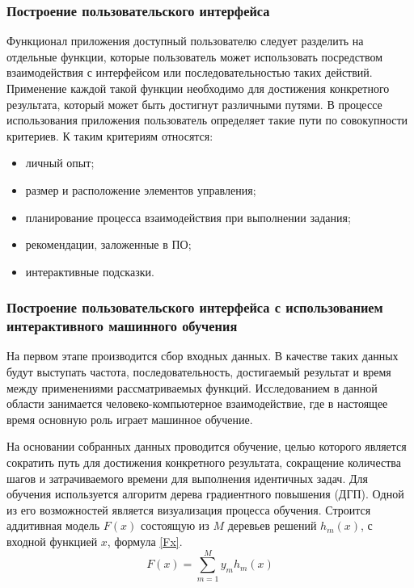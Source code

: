 \def\notedate{2022.10.13}
\def\currentauthor{Василян А.Р. (РК6-73Б)}

\subsubsection{Построение пользовательского интерфейса}

Функционал приложения доступный пользователю следует разделить на отдельные функции, которые пользователь может использовать посредством взаимодействия с интерфейсом или последовательностью таких действий. Применение каждой такой функции необходимо для достижения конкретного результата, который может быть достигнут различными путями. В процессе использования приложения пользователь определяет такие пути по совокупности критериев. К таким критериям относятся:
\begin{itemize}
	\item личный опыт; 
	\item размер и расположение элементов управления;
	\item планирование процесса взаимодействия при выполнении задания;
	\item рекомендации, заложенные в ПО; 
	\item интерактивные подсказки.
\end{itemize}

\subsubsection{Построение пользовательского интерфейса с использованием интерактивного машинного обучения}

На первом этапе производится сбор входных данных. В качестве таких данных будут выступать частота, последовательность, достигаемый результат и время между применениями рассматриваемых функций. Исследованием в данной области занимается человеко-компьютерное взаимодействие, где в настоящее время основную роль играет машинное обучение.

На основании собранных данных проводится обучение, целью которого является сократить путь для достижения конкретного результата, сокращение количества шагов и затрачиваемого времени для выполнения идентичных задач. Для обучения используется алгоритм дерева градиентного повышения (ДГП). Одной из его возможностей является визуализация процесса обучения. Строится аддитивная модель $F(x)$ состоящую из $M$ деревьев решений $h_m(x)$, с входной функцией $x$, формула \eqref{Fx}.
\begin{equation}\label{Fx}
   F(x)=\sum_{m=1}^M y_m h_m(x)
\end{equation}

